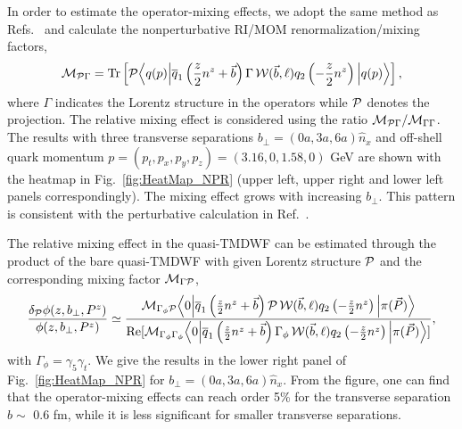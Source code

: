 {
In order to estimate the operator-mixing effects,  we adopt the same method as Refs.~\cite{Shanahan:2019zcq,Shanahan:2020zxr} and calculate the nonperturbative RI/MOM renormalization/mixing factors,
\begin{align}
{\cal M}_{{\cal P}\Gamma}=\textrm{Tr}\left[{\cal P}\Big\langle q(p)\Big|\overline q_1\left(\frac{z }{2}n^z +\vec b\right)\Gamma \,{\cal W}(\vec b,\ell)q_2\left(-\frac{z}{2}n^z \right)\Big| q(p)\Big\rangle\right],
\end{align}
where $\Gamma$ indicates the Lorentz structure in the operators while ${\cal P}$ denotes the projection. The relative mixing effect is considered using the ratio ${\cal M}_{{\cal P}\Gamma}/{\cal M}_{\Gamma\Gamma}$. The results with three transverse separations $b_\perp=(0a, 3a, 6a)\hat{n}_x$ and off-shell quark momentum $p=(p_t,p_x,p_y,p_z)=(3.16,0,1.58,0)$ GeV are shown with the heatmap in Fig.~\ref{fig:HeatMap_NPR} (upper left, upper right and lower left panels correspondingly). The mixing effect grows with increasing $b_\perp$. This pattern is   consistent with the perturbative calculation in Ref.~\cite{Shanahan:2019zcq}.}

{
The relative mixing effect in the quasi-TMDWF can be estimated through the product of the bare quasi-TMDWF with given Lorentz structure ${\cal P}$ and the corresponding mixing factor ${\cal M}_{\Gamma{\cal P}}$,
\begin{align}
\frac{\delta_{{\cal P}}\phi(z,b_\perp,P^z)}{\phi(z,b_\perp,P^z)}\simeq\frac{{\cal M}_{\Gamma_{\phi}{\cal P}}\Big\langle 0\Big|\overline q_1\left(\frac{z }{2}n^z +\vec b\right){\cal P}\,{\cal W}(\vec b,\ell)q_2\left(-\frac{z}{2}n^z \right)\Big| {\pi(\vec{P})}\Big\rangle}{\textrm{Re}[{\cal M}_{\Gamma_{\phi}\Gamma_{\phi}}\Big\langle 0\Big|\overline q_1\left(\frac{z }{2}n^z +\vec b\right){\Gamma_{\phi}}\,{\cal W}(\vec b,\ell)q_2\left(-\frac{z}{2}n^z \right)\Big| {\pi(\vec{P})}\Big\rangle]},
\end{align}
with $\Gamma_{\phi}=\gamma_5\gamma_t$.
We give the results in the lower right panel of Fig.~\ref{fig:HeatMap_NPR} for $b_\perp=(0a, 3a, 6a)\hat{n}_x$. From the figure, one can find that the operator-mixing effects can reach   order 5\% for the transverse separation $b\sim$ 0.6 fm, while it is less significant for smaller transverse separations. 
}



 

